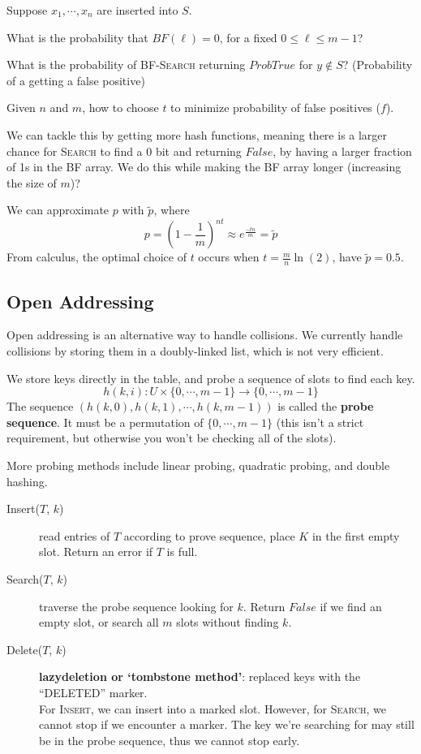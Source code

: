 \noindent Suppose $x_1, \cdots, x_n$ are inserted into $S$. 
\begin{problem}
    What is the probability that $BF(\ell) = 0$, for a fixed $0 \leq \ell \leq m - 1$? 
\end{problem}

\begin{problem}
    What is the probability of \textsc{BF-Search} returning $ProbTrue$ for $y \not \in S$? (Probability of a getting a false positive)
\end{problem}

\begin{problem}
    Given $n$ and $m$, how to choose $t$ to minimize probability of false positives ($f$). 
\end{problem}

We can tackle this by getting more hash functions, meaning there is a larger chance for \textsc{Search} to find a 0 bit and returning $False$, by having a larger fraction of 1s in the BF array. We do this while making the BF array longer (increasing the size of $m$)?

We can approximate $p$ with $\tilde{p}$, where
\[
p = \left(1 - \frac{1}{m}\right)^{nt} \approx e^{\frac{-tn}{m}} = \tilde{p}
\]
From calculus, the optimal choice of $t$ occurs when $t = \frac{m}{n} \ln (2)$, have $\tilde{{p}} = 0.5$.

\subsection{Open Addressing}

Open addressing is an alternative way to handle collisions. We currently handle collisions by storing them in a doubly-linked list, which is not very efficient.

We store keys directly in the table, and probe a sequence of slots to find each key.
\[
h(k, i) : U \times \{ 0, \cdots, m-1 \} \to \{ 0, \cdots, m-1 \}
\]
The sequence $(h(k, 0), h(k, 1), \cdots, h(k, m-1))$ is called the \textbf{probe sequence}. It must be a permutation of $\{ 0, \cdots, m-1 \}$ (this isn't a strict requirement, but otherwise you won't be checking all of the slots).

More probing methods include linear probing, quadratic probing, and double hashing.

\begin{description}
    \item[Insert($T$, $k$)] read entries of $T$ according to prove sequence, place $K$ in the first empty slot. Return an error if $T$ is full.
    \item[Search($T$, $k$)] traverse the probe sequence looking for $k$. Return $False$ if we find an empty slot, or search all $m$ slots without finding $k$.
    \item[Delete($T$, $k$)] \textbf{lazydeletion or `tombstone method'}: replaced keys with the ``DELETED'' marker.\\
    For \textsc{Insert}, we can insert into a marked slot. However, for \textsc{Search}, we cannot stop if we encounter a marker. The key we're searching for may still be in the probe sequence, thus we cannot stop early.
\end{description}
